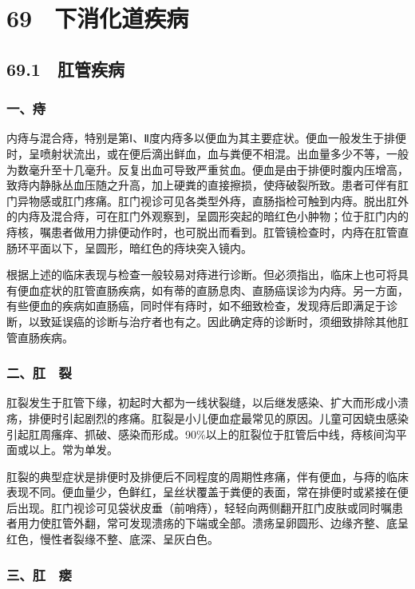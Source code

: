 \protect\hypertarget{text00174.html}{}{}

\section{69　下消化道疾病}

\subsection{69.1　肛管疾病}

\subsubsection{一、痔}

内痔与混合痔，特别是第Ⅰ、Ⅱ度内痔多以便血为其主要症状。便血一般发生于排便时，呈喷射状流出，或在便后滴出鲜血，血与粪便不相混。出血量多少不等，一般为数毫升至十几毫升。反复出血可导致严重贫血。便血是由于排便时腹内压增高，致痔内静脉丛血压随之升高，加上硬粪的直接擦损，使痔破裂所致。患者可伴有肛门异物感或肛门疼痛。肛门视诊可见各类型外痔，直肠指检可触到内痔。脱出肛外的内痔及混合痔，可在肛门外观察到，呈圆形突起的暗红色小肿物；位于肛门内的痔核，嘱患者做用力排便动作时，也可脱出而看到。肛管镜检查时，内痔在肛管直肠环平面以下，呈圆形，暗红色的痔块突入镜内。

根据上述的临床表现与检查一般较易对痔进行诊断。但必须指出，临床上也可将具有便血症状的肛管直肠疾病，如有蒂的直肠息肉、直肠癌误诊为内痔。另一方面，有些便血的疾病如直肠癌，同时伴有痔时，如不细致检查，发现痔后即满足于诊断，以致延误癌的诊断与治疗者也有之。因此确定痔的诊断时，须细致排除其他肛管直肠疾病。

\subsubsection{二、肛　裂}

肛裂发生于肛管下缘，初起时大都为一线状裂缝，以后继发感染、扩大而形成小溃疡，排便时引起剧烈的疼痛。肛裂是小儿便血症最常见的原因。儿童可因蛲虫感染引起肛周瘙痒、抓破、感染而形成。90\%以上的肛裂位于肛管后中线，痔核间沟平面或以上。常为单发。

肛裂的典型症状是排便时及排便后不同程度的周期性疼痛，伴有便血，与痔的临床表现不同。便血量少，色鲜红，呈丝状覆盖于粪便的表面，常在排便时或紧接在便后出现。肛门视诊可见袋状皮垂（前哨痔），轻轻向两侧翻开肛门皮肤或同时嘱患者用力使肛管外翻，常可发现溃疡的下端或全部。溃疡呈卵圆形、边缘齐整、底呈红色，慢性者裂缘不整、底深、呈灰白色。

\subsubsection{三、肛　瘘}

